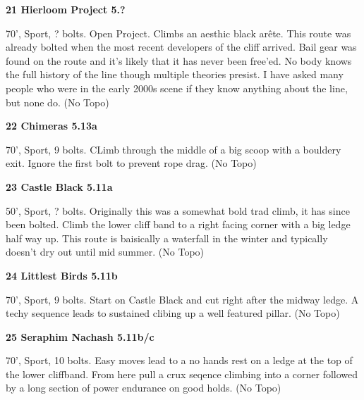 \begin{multicols}{2}
\needspace{1.5cm}
\label{rt:Hierloom Project}
\colorbox{black!20}{
\parbox{0.95\linewidth}{
\textbf{
21 Hierloom Project 5.?  
}}}
\begin{adjustwidth}{0.5cm}{}			
70', Sport, ? bolts. Open Project. Climbs an aesthic black arête. This route was already bolted when the most recent developers of the cliff arrived. Bail gear was found on the route and it's likely that it has never been free'ed. No body knows the full history of the line though multiple theories presist. I have asked many people who were in the early 2000s scene if they know anything about the line, but none do.
  (No Topo)
\end{adjustwidth}




\needspace{1.5cm}
\label{rt:Chimeras}
\colorbox{Goldenrod!50}{
\parbox{0.95\linewidth}{
\textbf{
22 Chimeras 5.13a  
}}}
\begin{adjustwidth}{0.5cm}{}			
70', Sport, 9 bolts. CLimb through the middle of a big scoop with a bouldery exit. Ignore the first bolt to prevent rope drag.
  (No Topo)
\end{adjustwidth}




\needspace{1.5cm}
\label{rt:Castle Black}
\colorbox{RoyalBlue!20}{
\parbox{0.95\linewidth}{
\textbf{
23 Castle Black 5.11a  
}}}
\begin{adjustwidth}{0.5cm}{}			
50', Sport, ? bolts. Originally this was a somewhat bold trad climb, it has since been bolted. Climb the lower cliff band to a right facing corner with a big ledge half way up. This route is baisically a waterfall in the winter and typically doesn't dry out until mid summer.
  (No Topo)
\end{adjustwidth}




\needspace{1.5cm}
\label{rt:Littlest Birds}
\colorbox{RoyalBlue!20}{
\parbox{0.95\linewidth}{
\textbf{
24 Littlest Birds 5.11b  
}}}
\begin{adjustwidth}{0.5cm}{}			
70', Sport, 9 bolts. Start on Castle Black and cut right after the midway ledge. A techy sequence leads to sustained clibing up a well featured pillar.
  (No Topo)
\end{adjustwidth}




\needspace{1.5cm}
\label{rt:Seraphim Nachash}
\colorbox{RoyalBlue!20}{
\parbox{0.95\linewidth}{
\textbf{
25 Seraphim Nachash 5.11b/c  
}}}
\begin{adjustwidth}{0.5cm}{}			
70', Sport, 10 bolts. Easy moves lead to a no hands rest on a ledge at the top of the lower cliffband. From here pull a crux seqence climbing into a corner followed by a long section of power endurance on good holds.
  (No Topo)
\end{adjustwidth}





\end{multicols}

